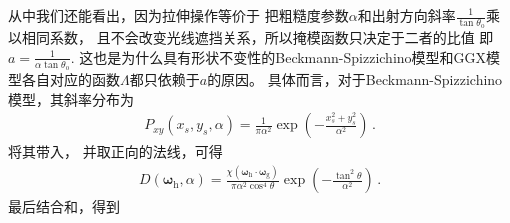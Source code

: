 从中我们还能看出，因为拉伸操作等价于
把粗糙度参数$\alpha$和出射方向斜率$\displaystyle\frac{1}{\tan\theta_{\mathrm{o}}}$乘以相同系数，
且不会改变光线遮挡关系，所以掩模函数只决定于二者的比值
即$\displaystyle a=\frac{1}{\alpha\tan\theta_{\mathrm{o}}}$.
这也是为什么具有形状不变性的Beckmann-Spizzichino模型和GGX模型各自对应的函数$\Lambda$都只依赖于$a$的原因。
具体而言，对于Beckmann-Spizzichino模型\citep{1987BeckmannSpizzichino}，其斜率分布为
\begin{align}
    P_{xy}(x_s,y_s,\alpha)=\frac{1}{\pi\alpha^2}\exp\left(-\frac{x_s^2+y_s^2}{\alpha^2}\right)\, .
\end{align}
将其带入，
并取正向的法线，可得
\begin{align}
    D({\bm\omega}_{\mathrm{h}},\alpha)=\frac{\chi({\bm\omega}_{\mathrm{h}}\cdot{\bm\omega}_{\mathrm{g}})}
    {\pi\alpha^2\cos^4\theta}\exp\left(-\frac{\tan^2\theta}{\alpha^2}\right)\, .
\end{align}
最后结合和，得到
